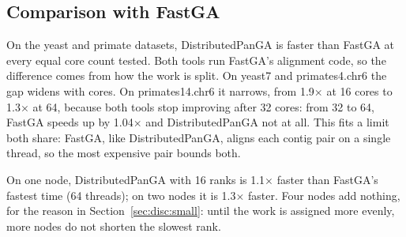 \subsection{Comparison with FastGA}\label{sec:disc:fastga}

On the yeast and primate datasets,
DistributedPanGA is faster than FastGA at every equal core count tested. Both tools run FastGA's alignment code, so the
difference comes from how the work is split. On yeast7 and primates4.chr6
the gap widens with cores. On primates14.chr6 it narrows, from 1.9$\times$
at 16 cores to 1.3$\times$ at 64, because both tools stop improving after 32
cores: from 32 to 64, FastGA speeds up by 1.04$\times$ and DistributedPanGA
not at all. This fits a limit both share: FastGA, like DistributedPanGA,
aligns each contig pair on a single thread, so the most expensive pair
bounds both.

On one node, DistributedPanGA with 16 ranks is 1.1$\times$ faster than
FastGA's fastest time (64 threads); on two nodes it is 1.3$\times$ faster. Four nodes add nothing,
for the reason in Section~\ref{sec:disc:small}: until the work is assigned more evenly, more nodes do
not shorten the slowest rank.

